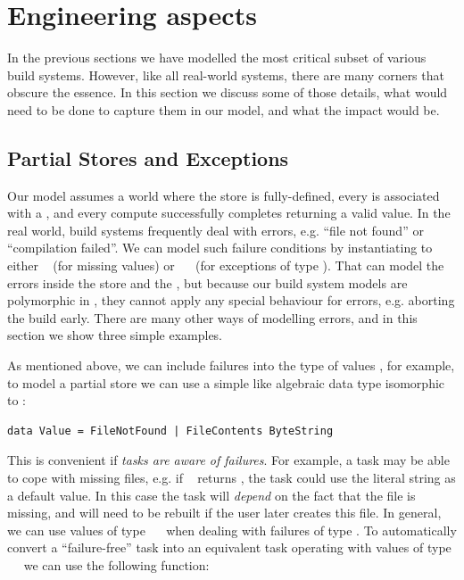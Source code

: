\section{Engineering aspects}\label{sec-engineering}

In the previous sections we have modelled the most critical subset of various
build systems. However, like all real-world systems, there are many corners that
obscure the essence. In this section we discuss some of those details, what
would need to be done to capture them in our model, and what the impact would be.

\subsection{Partial Stores and Exceptions}

Our model assumes a world where the store is fully-defined, every  is
associated with a , and every compute successfully completes returning a
valid value. In the real world, build systems frequently deal with errors, e.g.
``file not found'' or ``compilation failed''. We can model such failure
conditions by instantiating  to either ~ (for missing
values) or ~~ (for exceptions of type ). That can
model the errors inside the store and the , but because our build
system models are polymorphic in , they cannot apply any special behaviour
for errors, e.g. aborting the build early. There are many other ways of
modelling errors, and in this section we show three simple examples.

As mentioned above, we can include failures into the type of values , for
example, to model a partial store we can use a simple like algebraic data type
isomorphic to :

\vspace{1mm}
\begin{verbatim}
data Value = FileNotFound | FileContents ByteString
\end{verbatim}
\vspace{1mm}

\noindent
This is convenient if \emph{tasks are aware of failures}. For example, a task
may be able to cope with missing files, e.g. if ~
returns , the task could use the literal string  as
a default value. In this case the task will \emph{depend} on the fact that the
file  is missing, and will need to be rebuilt if the user
later creates this file. In general, we can use values of type
~~ when dealing with failures of type . To
automatically convert a ``failure-free'' task into an equivalent task operating
with values of type ~~ we can use the following function:

